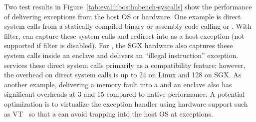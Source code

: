 Two test results in Figure~\ref{tab:eval:libos:lmbench-syscalls}
show the performance of delivering exceptions from the host OS or hardware.
One example is direct system calls from a statically
compiled binary
or assembly code calling  or .
With \seccomp{} filter,
\graphene{} can capture these system calls and redirect into \thelibos{} as a host exception (not supported if \seccomp{} filter is disabled).
For \graphenesgx{},
the SGX hardware also captures these system calls
inside an enclave
and delivers an
``illegal instruction'' exception.
\graphene{} services these direct system calls primarily as a compatibility feature;
however, the overhead on direct system calls
is up to 24\x{} on Linux and 128\x{} on SGX.
As another example,
delivering a memory fault
into a \picoproc{} and an enclave also has significant overheads at 3\x{} and 15\x{} compared to native performance.
A potential optimization
is to virtualize the exception handler using hardware support such as VT~\cite{VT} so that a \libos{} can avoid trapping
into the host OS
at exceptions.















